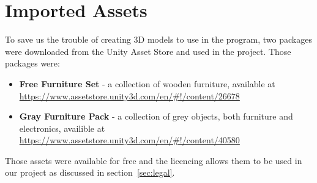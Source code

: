 
\section{Imported Assets}
To save us the trouble of creating 3D models to use in the program, two packages were downloaded from the Unity Asset Store and used in the project. Those packages were:
\begin{itemize}
    \item \textbf{Free Furniture Set} - a collection of wooden furniture, available at \url{https://www.assetstore.unity3d.com/en/#!/content/26678}
    \item \textbf{Gray Furniture Pack} - a collection of grey objects, both furniture and electronics, availible at \url{https://www.assetstore.unity3d.com/en/#!/content/40580} 
\end{itemize}

Those assets were available for free and the licencing allows them to be used in our project as discussed in section~\ref{sec:legal}.
